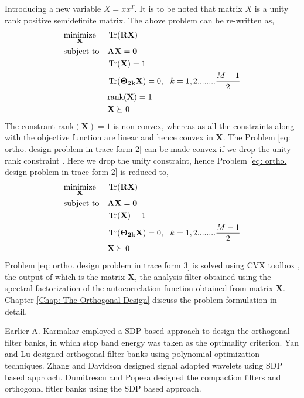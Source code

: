 Introducing a new variable $X={xx^T}$. It is to be noted that matrix $X$ is a unity rank positive semidefinite matrix. The above problem can be re-written as,
\begin{equation}
	\label{eq: ortho. design problem in trace form 2}
		\begin{aligned}
		& \underset{\mathbf{X}}{\text{minimize}}
		& & \operatorname{Tr}(\mathbf{RX}) \\
		& \text{subject to}
		& & \mathbf{AX}=\mathbf{0} \\
		&&& \operatorname{Tr}(\mathbf{X})=1\\
		&&& \operatorname{Tr}(\mathbf{\Theta_{2k}}\mathbf{X})=0,\,\,\,\, k=1,2........\frac{M-1}{2}\\
		&&&\text{rank}(\mathbf{X}) = 1\\
		&&&\mathbf{X} \succeq 0
		\end{aligned}
		\end{equation}
The constrant $\text{rank}(\mathbf{X}) = 1$ is non-convex, whereas as all the constraints along with the objective function are linear and hence convex in  $\mathbf{X}$. The Problem \ref{eq: ortho. design problem in trace form 2} can be made convex if we drop the unity rank constraint \cite{SDR}. Here we drop the unity constraint, hence Problem \ref{eq: ortho. design problem in trace form 2} is reduced to,
\begin{equation}
	\label{eq: ortho. design problem in trace form 3}
		\begin{aligned}
		& \underset{\mathbf{X}}{\text{minimize}}
		& & \operatorname{Tr}(\mathbf{RX}) \\
		& \text{subject to}
		& & \mathbf{AX}=\mathbf{0} \\
		&&& \operatorname{Tr}(\mathbf{X})=1\\
		&&& \operatorname{Tr}(\mathbf{\Theta_{2k}}\mathbf{X})=0,\,\,\,\, k=1,2........\frac{M-1}{2}\\
		&&&\mathbf{X} \succeq 0
		\end{aligned}
		\end{equation}
Problem \ref{eq: ortho. design problem in trace form 3} is solved using CVX toolbox \cite{cvx}, the output of which is the matrix $\mathbf{X}$, the analysis filter obtained using the spectral factorization of the autocorrelation function obtained from matrix $\mathbf{X}$. Chapter \ref{Chap: The Orthogonal Design} discuss the problem formulation in detail.

Earlier A. Karmakar \cite{Karmakar} employed a SDP \cite{sdp} based approach to design the orthogonal filter banks, in which stop band energy was taken as the optimality criterion. Yan and Lu \cite{TowardsGlobal} designed orthogonal filter banks using polynomial optimization techniques. Zhang and Davidson \cite{Zhang} designed signal adapted wavelets using SDP based approach. Dumitrescu and Popeea \cite{PolynomialBook, AccurateComputation} designed the compaction filters and orthogonal fitler banks using the SDP based approach. 

